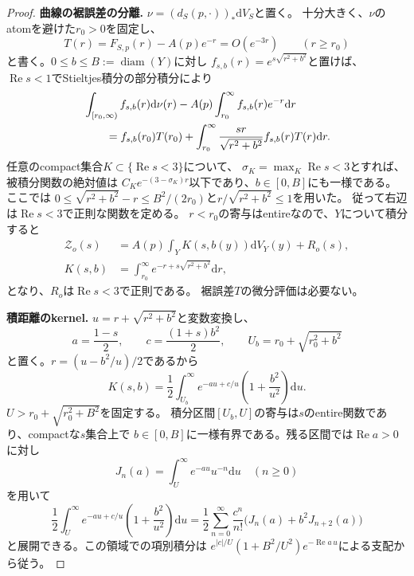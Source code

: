 \documentclass[11pt,a4paper]{ltjsarticle}
\newcommand{\dd}{\mathrm d}
\newcommand{\diam}{\operatorname{diam}}
\theoremstyle{plain}
\theoremstyle{definition}
\theoremstyle{remark}
\begin{document}
\begin{proof}
\par\smallskip\noindent\textbf{曲線の裾誤差の分離.}\quad
$\nu=(d_S(p,\cdot))_*\dd V_S$と置く。
十分大きく、$\nu$のatomを避けた$r_0>0$を固定し、
\[
 T(r)=F_{S,p}(r)-A(p)e^{-r}=O(e^{-3r})
 \qquad(r\ge r_0)
\]
と書く。$0\le b\le B:=\diam(Y)$に対し
$f_{s,b}(r)=e^{s\sqrt{r^2+b^2}}$と置けば、
$\operatorname{Re}s<1$でStieltjes積分の部分積分により
\begin{align}
 &\int_{[r_0,\infty)}f_{s,b}(r)\dd\nu(r)
       -A(p)\int_{r_0}^{\infty}f_{s,b}(r)e^{-r}\dd r
 \notag\\
 &\qquad=f_{s,b}(r_0)T(r_0)
   +\int_{r_0}^{\infty}
      \frac{sr}{\sqrt{r^2+b^2}}f_{s,b}(r)T(r)\dd r.
 \label{eq:product-stieltjes-remainder}
\end{align}
任意のcompact集合$K\subset\{\operatorname{Re}s<3\}$について、
$\sigma_K=\max_K\operatorname{Re}s<3$とすれば、被積分関数の絶対値は
$C_K e^{-(3-\sigma_K)r}$以下であり、$b\in[0,B]$にも一様である。
ここでは
$0\le\sqrt{r^2+b^2}-r\le B^2/(2r_0)$と$r/\sqrt{r^2+b^2}\le1$を用いた。
従って右辺は$\operatorname{Re}s<3$で正則な関数を定める。
$r<r_0$の寄与はentireなので、$Y$について積分すると
\begin{align*}
 \mathcal Z_o(s)&=A(p)\int_Y K(s,b(y))\dd V_Y(y)+R_o(s),\\
 K(s,b)&=\int_{r_0}^{\infty}e^{-r+s\sqrt{r^2+b^2}}\dd r,
\end{align*}
となり、$R_o$は$\operatorname{Re}s<3$で正則である。
裾誤差$T$の微分評価は必要ない。

\par\smallskip\noindent\textbf{積距離のkernel.}\quad
$u=r+\sqrt{r^2+b^2}$と変数変換し、
\[
 a=\frac{1-s}{2},\qquad c=\frac{(1+s)b^2}{2},\qquad
 U_b=r_0+\sqrt{r_0^2+b^2}
\]
と置く。$r=(u-b^2/u)/2$であるから
\begin{equation}
\label{eq:product-kernel-u}
 K(s,b)=\frac12\int_{U_b}^{\infty}
             e^{-au+c/u}\left(1+\frac{b^2}{u^2}\right)\dd u.
\end{equation}
$U>r_0+\sqrt{r_0^2+B^2}$を固定する。
積分区間$[U_b,U]$の寄与は$s$のentire関数であり、compactな$s$集合上で
$b\in[0,B]$に一様有界である。残る区間では$\operatorname{Re}a>0$に対し
\[
 J_n(a)=\int_U^\infty e^{-au}u^{-n}\dd u
 \quad(n\ge0)
\]
を用いて
\[
 \frac12\int_U^\infty
       e^{-au+c/u}\left(1+\frac{b^2}{u^2}\right)\dd u
 =\frac12\sum_{n=0}^{\infty}
       \frac{c^n}{n!}\bigl(J_n(a)+b^2J_{n+2}(a)\bigr)
\]
と展開できる。この領域での項別積分は
$e^{|c|/U}(1+B^2/U^2)e^{-\operatorname{Re}a\,u}$による支配から従う。


\end{proof}
\end{document}
